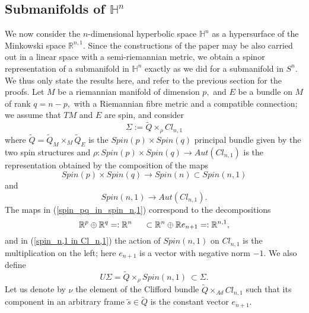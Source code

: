 \documentclass{amsart}
\begin{document}
\subsection{Submanifolds of $\mathbb{H}^n$}
We now consider the $n$-dimensional hyperbolic space $\mathbb{H}^n$ as a hypersurface of the Minkowski space ${\mathbb{R}}^{n,1}.$ Since the constructions of the paper may be also carried out in a linear space with a semi-riemannian metric, we obtain a spinor representation of a submanifold in $\mathbb{H}^n$ exactly as we did for a submanifold in $S^n.$ We thus only state the results here, and refer to the previous section for the proofs. Let $M$ be a riemannian manifold of dimension $p,$ and $E$ be a bundle on $M$ of rank $q=n-p,$ with a Riemannian fibre metric and a compatible connection; we assume that $TM$ and $E$ are spin, and consider
$$\Sigma:=\tilde{Q}\times_{\rho} Cl_{n,1}$$
where $\tilde{Q}=\tilde{Q}_M\times_M \tilde{Q}_E$ is the $Spin(p)\times Spin(q)$ principal bundle given by the two spin structures and $\rho:Spin(p)\times Spin(q)\rightarrow Aut(Cl_{n,1})$ is the representation obtained by the composition of the maps 
\begin{equation}\label{spin_pq_in_spin_n,1}
Spin(p)\times Spin(q)\rightarrow Spin(n)\subset Spin(n,1)
\end{equation}
and 
\begin{equation}\label{spin_n,1 in Cl_n,1}
Spin(n,1)\rightarrow Aut(Cl_{n,1}).
\end{equation}
The maps in (\ref{spin_pq_in_spin_n,1}) correspond to the decompositions
$${\mathbb{R}}^p\oplus{\mathbb{R}}^q=:{\mathbb{R}}^n\hspace{.5cm}\subset {\mathbb{R}}^n\oplus{\mathbb{R}} e_{n+1}=:{\mathbb{R}}^{n,1},$$ and in (\ref{spin_n,1 in Cl_n,1}) the action of $Spin(n,1)$ on $Cl_{n,1}$ is the multiplication on the left; here $e_{n+1}$ is a vector with negative norm $-1.$ We also define
$$U\Sigma=\tilde{Q}\times_{\rho} Spin(n,1)\ \subset \Sigma.$$
Let us denote by $\nu$ the element of the Clifford bundle $\tilde{Q}\times_{Ad} Cl_{n,1}$ such that its component in an arbitrary frame $\tilde{s}\in \tilde{Q}$ is the constant vector $e_{n+1}.$
\end{document}
